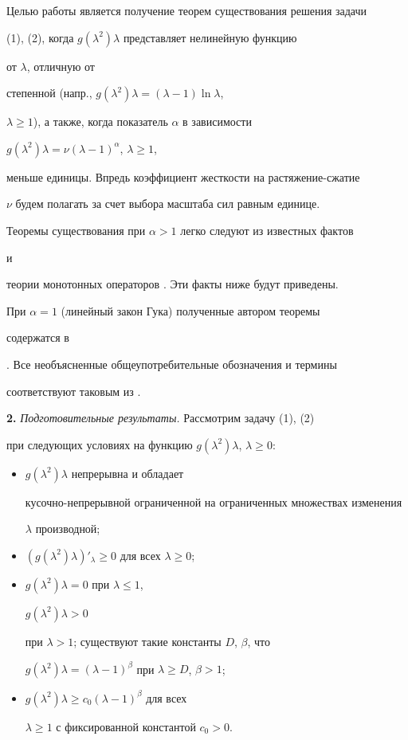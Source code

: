  


Целью работы является получение теорем существования решения задачи 


(1), (2), когда $g(\lambda^2)\lambda$ представляет нелинейную функцию 


от $\lambda$, отличную от 


степенной (напр., $g(\lambda^2)\lambda=(\lambda-1)\ln\lambda$, 


$\lambda\ge 1$), а также, когда показатель $\alpha$ в зависимости 


$g(\lambda^2)\lambda=\nu(\lambda-1)^\alpha$, $\lambda\ge 1$,


меньше единицы. Впредь коэффициент жесткости на растяжение-сжатие 


$\nu$ будем полагать за счет выбора масштаба сил равным единице. 


Теоремы существования при $\alpha>1$ легко следуют из известных фактов 


\cite{3} и 


теории монотонных операторов \cite{4}. Эти факты ниже будут приведены. 


При $\alpha=1$ (линейный закон Гука) полученные автором теоремы 


содержатся в 


\cite{2}. Все необъясненные общеупотребительные обозначения и термины 


соответствуют таковым из \cite{4}. 


\medskip 


 


{\bf 2.} {\it Подготовительные результаты.} Рассмотрим задачу (1), (2) 


при следующих условиях на функцию $g(\lambda^2)\lambda$, $\lambda\ge 0$: 


\begin{itemize} 


\item[1)] $g(\lambda^2)\lambda$ непрерывна и обладает 


кусочно-непрерывной ограниченной на ограниченных множествах изменения 


$\lambda$ производной; 


\item[2)] 


$(g(\lambda^2)\lambda)'_\lambda\ge 0$ для всех $\lambda\ge 0$; 


\item[3)] $g(\lambda^2)\lambda=0$ при $\lambda\le 1$, 


$g(\lambda^2)\lambda>0$ 


при $\lambda>1$; существуют такие константы $D$, $\beta$, что 


$g(\lambda^2)\lambda=(\lambda-1)^\beta$ при $\lambda\ge D$, $\beta>1$; 


\item[4)] $g(\lambda^2)\lambda\ge c_0(\lambda-1)^\beta$ для всех 


$\lambda\ge 1$ с фиксированной константой $c_0>0$. 


\end{itemize} 


